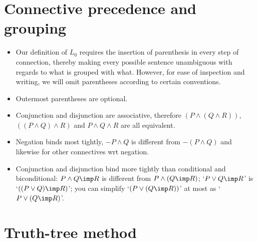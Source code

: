 \documentclass[11pt]{article}
\begin{document}
\section{Connective precedence and grouping}

\begin{itemize}

\item Our definition of $L_0$ requires the insertion of parenthesis in every step
of connection, thereby making every possible sentence unambiguous with regards to
what is grouped with what. However, for ease of inspection and writing, we will
omit parentheses according to certain conventions. 

\item Outermost parentheses are optional. 

\item Conjunction and disjunction are associative, therefore $(P\land (Q\land
R))$, $((P\land Q)\land R)$ and $P\land Q\land R$ are all equivalent.

\item Negation binds most tightly, $-P\land Q$ is different from $-(P\land Q)$
and likewise for other connectives wrt negation. 

\item
Conjunction and disjunction
bind more tightly than conditional and biconditional: $P\land Q \imp R$  is
different from $P\land (Q\imp R)$; 
`$P\lor Q\imp R$' is `$((P\lor Q) \imp R)$'; you can
simplify `$(P\lor(Q\imp R))$' at most as `$P\lor(Q\imp R)$'.

% 
% 
\end{itemize}

\section{Truth-tree method}
\end{document}
